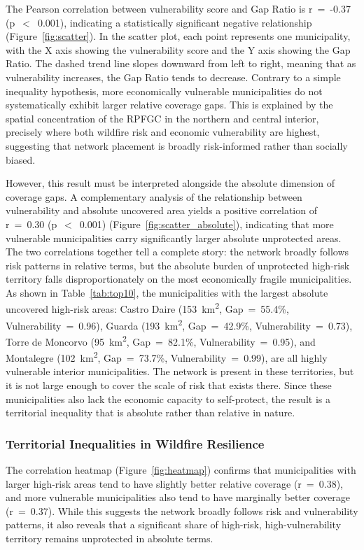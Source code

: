 The Pearson correlation between vulnerability score and Gap Ratio
is r~=~-0.37 (p~$<$~0.001), indicating a statistically significant
negative relationship (Figure~\ref{fig:scatter}). In the scatter
plot, each point represents one municipality, with the X axis
showing the vulnerability score and the Y axis showing the Gap
Ratio. The dashed trend line slopes downward from left to right,
meaning that as vulnerability increases, the Gap Ratio tends to
decrease. Contrary to a simple inequality hypothesis, more
economically vulnerable municipalities do not systematically
exhibit larger relative coverage gaps. This is explained by the
spatial concentration of the RPFGC in the northern and central
interior, precisely where both wildfire risk and economic
vulnerability are highest, suggesting that network placement
is broadly risk-informed rather than socially biased.

However, this result must be interpreted alongside the absolute
dimension of coverage gaps. A complementary analysis of the
relationship between vulnerability and absolute uncovered area
yields a positive correlation of r~=~0.30 (p~$<$~0.001)
(Figure~\ref{fig:scatter_absolute}), indicating that more vulnerable
municipalities carry significantly larger absolute unprotected areas.
The two correlations together tell a complete story: the network
broadly follows risk patterns in relative terms, but the absolute
burden of unprotected high-risk territory falls disproportionately
on the most economically fragile municipalities. As shown in
Table~\ref{tab:top10}, the municipalities with the largest absolute
uncovered high-risk areas: Castro Daire
(153~km\textsuperscript{2}, Gap~=~55.4\%, Vulnerability~=~0.96),
Guarda (193~km\textsuperscript{2}, Gap~=~42.9\%,
Vulnerability~=~0.73), Torre de Moncorvo
(95~km\textsuperscript{2}, Gap~=~82.1\%, Vulnerability~=~0.95),
and Montalegre (102~km\textsuperscript{2}, Gap~=~73.7\%,
Vulnerability~=~0.99), are all highly vulnerable interior
municipalities. The network is present in these territories, but
it is not large enough to cover the scale of risk that exists
there. Since these municipalities also lack the economic capacity
to self-protect, the result is a territorial inequality that is
absolute rather than relative in nature.
\subsubsection*{Territorial Inequalities in Wildfire Resilience}

The correlation heatmap (Figure~\ref{fig:heatmap}) confirms that
municipalities with larger high-risk areas tend to have slightly
better relative coverage (r~=~0.38), and more vulnerable
municipalities also tend to have marginally better coverage
(r~=~0.37). While this suggests the network broadly follows
risk and vulnerability patterns, it also reveals that a
significant share of high-risk, high-vulnerability territory
remains unprotected in absolute terms.

